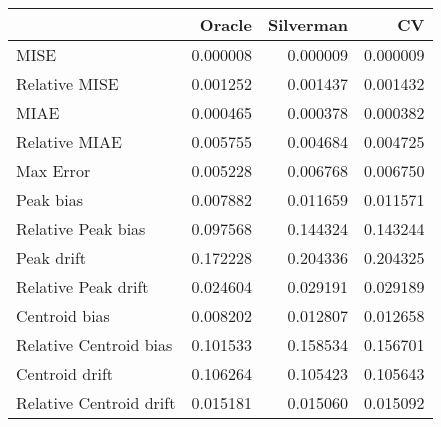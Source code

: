 \begin{tabular}{lrrr}
  \hline
 & Oracle & Silverman & CV \\ 
  \hline
MISE & 0.000008 & 0.000009 & 0.000009 \\ 
  Relative MISE & 0.001252 & 0.001437 & 0.001432 \\ 
  MIAE & 0.000465 & 0.000378 & 0.000382 \\ 
  Relative MIAE & 0.005755 & 0.004684 & 0.004725 \\ 
  Max Error & 0.005228 & 0.006768 & 0.006750 \\ 
  Peak bias & 0.007882 & 0.011659 & 0.011571 \\ 
  Relative Peak bias & 0.097568 & 0.144324 & 0.143244 \\ 
  Peak drift & 0.172228 & 0.204336 & 0.204325 \\ 
  Relative Peak drift & 0.024604 & 0.029191 & 0.029189 \\ 
  Centroid bias & 0.008202 & 0.012807 & 0.012658 \\ 
  Relative Centroid bias & 0.101533 & 0.158534 & 0.156701 \\ 
  Centroid drift & 0.106264 & 0.105423 & 0.105643 \\ 
  Relative Centroid drift & 0.015181 & 0.015060 & 0.015092 \\ 
   \hline
\end{tabular}
